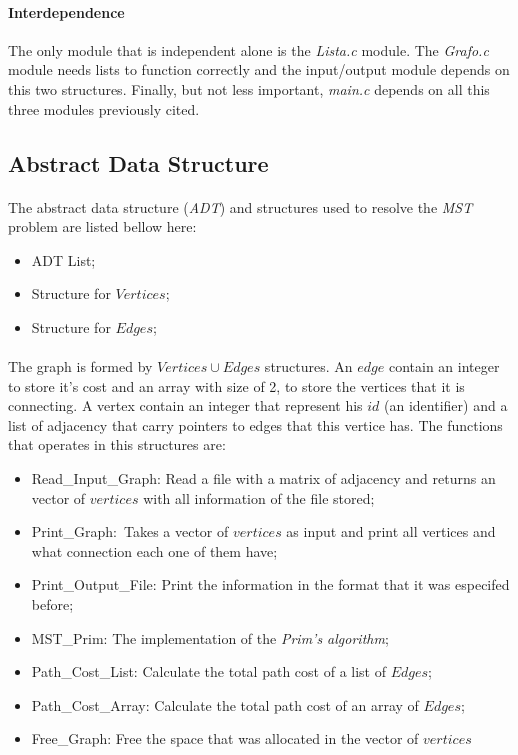 \documentclass[titlepage]{article}
\begin{document}
        \paragraph{Interdependence}The only module that is independent alone is the \emph{Lista.c} module. The \emph{Grafo.c} module needs lists to function correctly and the input/output module depends on this two structures. Finally, but not less important, \emph{main.c} depends on all this three modules previously cited.
        \subsection{Abstract Data Structure}
        \paragraph{}
        The abstract data structure (\emph{ADT}) and structures used to resolve the \emph{MST} problem are listed bellow here:
        \begin{itemize}
            \item ADT List;
            \item Structure for $Vertices$;
            \item Structure for $Edges$;
        \end{itemize} 
        \paragraph{}
        The graph is formed by ${Vertices \cup Edges}$ structures. An $edge$ contain an integer to store it's cost and an array with size of 2, to store the vertices that it is connecting. A vertex contain an integer that represent his $id$ (an identifier) and a list of adjacency that carry pointers to edges that this vertice has. The functions that operates in this structures are:
        \begin{itemize}
            \item Read\_Input\_Graph: Read a file with a matrix of adjacency and returns an vector of $vertices$ with all information of the file stored;
            \item Print\_Graph:\ Takes a vector of $vertices$ as input and print all vertices and what connection each one of them have;
            \item Print\_Output\_File: Print the information in the format that it was especifed before;
            \item MST\_Prim: The implementation of the \emph{Prim's algorithm};
            \item Path\_Cost\_List: Calculate the total path cost of a list of $Edges$;
            \item Path\_Cost\_Array: Calculate the total path cost of an array of $Edges$;
            \item Free\_Graph: Free the space that was allocated in the vector of $vertices$
        \end{itemize}
\end{document}
